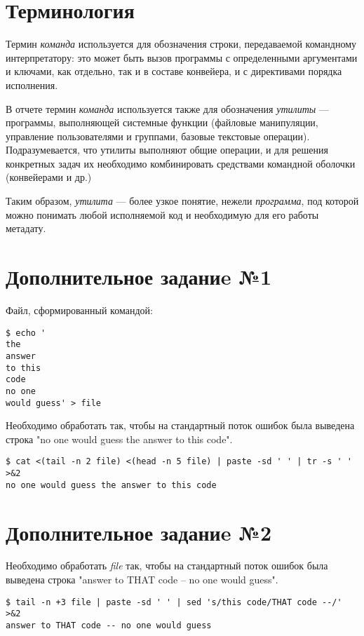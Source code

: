 \documentclass[listings]{labreport}
\begin{document}
\section*{Терминология}

Термин \textit{команда} используется для обозначения строки, передаваемой командному интерпретатору: это может быть вызов программы с
определенными аргументами и ключами, как отдельно, так и в составе конвейера, и с директивами порядка исполнения.

В отчете термин \textit{команда} используется также для обозначения \textit{утилиты} — программы, выполняющей системные функции
(файловые манипуляции, управление пользователями и группами, базовые текстовые операции). Подразумевается, что утилиты выполняют
общие операции, и для решения конкретных задач их необходимо комбинировать средствами командной оболочки (конвейерами и др.)

Таким образом, \textit{утилита} — более узкое понятие, нежели \textit{программа}, под которой можно понимать любой исполняемой код
и необходимую для его работы метадату.

\section*{Дополнительное заданиe №1}

Файл, сформированный командой:
\begin{verbatim}
$ echo '
the
answer
to this
code
no one
would guess' > file
\end{verbatim}

Необходимо обработать так, чтобы на стандартный поток ошибок была выведена строка "no one would guess the answer to this code".

\begin{verbatim}
$ cat <(tail -n 2 file) <(head -n 5 file) | paste -sd ' ' | tr -s ' ' >&2
no one would guess the answer to this code
\end{verbatim}

\section*{Дополнительное заданиe №2}

Необходимо обработать \textit{file} так, чтобы на стандартный поток ошибок была выведена строка "answer to THAT code -- no one would guess".

\begin{verbatim}
$ tail -n +3 file | paste -sd ' ' | sed 's/this code/THAT code --/' >&2
answer to THAT code -- no one would guess
\end{verbatim}
\end{document}
